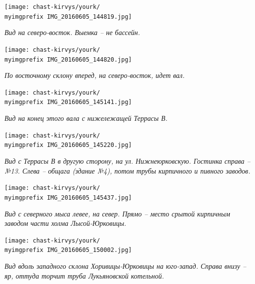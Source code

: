 \newpage

\begin{center}
\texttt{[image: chast-kirvys/yourk/\\myimgprefix IMG\_20160605\_144819.jpg]}

\textit{Вид на северо-восток. Выемка – не бассейн.}
\end{center}

\begin{center}
\texttt{[image: chast-kirvys/yourk/\\myimgprefix IMG\_20160605\_144820.jpg]}

\textit{По восточному склону вперед, на северо-восток, идет вал.}
\end{center}

\newpage

\begin{center}
\texttt{[image: chast-kirvys/yourk/\\myimgprefix IMG\_20160605\_145141.jpg]}

\textit{Вид на конец этого вала с нижележащей Террасы В.}
\end{center}


\begin{center}
\texttt{[image: chast-kirvys/yourk/\\myimgprefix IMG\_20160605\_145220.jpg]}

\textit{Вид с Террасы В в другую сторону, на ул. Нижнеюрковскую. Гостинка справа – №13. Слева – общага (здание №4), потом трубы кирпичного и пивного заводов.}
\end{center}

\newpage

\begin{center}
\texttt{[image: chast-kirvys/yourk/\\myimgprefix IMG\_20160605\_145437.jpg]}

\textit{Вид с северного мыса левее, на север. Прямо – место срытой кирпичным заводом части холма Лысой-Юрковицы.}
\end{center}


\begin{center}
\texttt{[image: chast-kirvys/yourk/\\myimgprefix IMG\_20160605\_150002.jpg]}

\textit{Вид вдоль западного склона Хоривицы-Юрковицы на юго-запад. Справа внизу – яр, оттуда торчит труба Лукьяновской котельной.}
\end{center}

\newpage

